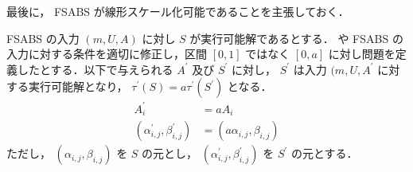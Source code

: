 最後に， FSABS が線形スケール化可能であることを主張しておく．
\begin{claim}\label{claim:fsabs-scalable}
  FSABS の入力 $(m, U, A)$ に対し $S$ が実行可能解であるとする．  や FSABS の入力に対する条件を適切に修正し，区間 $[0, 1]$ ではなく $[0, a]$ に対し問題を定義したとする．以下で与えられる $A^\prime$ 及び $S^\prime$ に対し， $S^\prime$ は入力 $(m, U, A^\prime$ に対する実行可能解となり， $\tau^\prime(S) = a\tau^\prime(S^\prime)$ となる．
  \begin{align}
    A^\prime_i &= aA_i \\
    (\alpha^\prime_{i,j},\beta^\prime_{i,j}) &= (a\alpha_{i,j},\beta_{i,j})
  \end{align}
  ただし， $(\alpha_{i,j},\beta_{i,j})$ を $S$ の元とし， $(\alpha^\prime_{i,j},\beta^\prime_{i,j})$ を $S^\prime$ の元とする．
\end{claim}